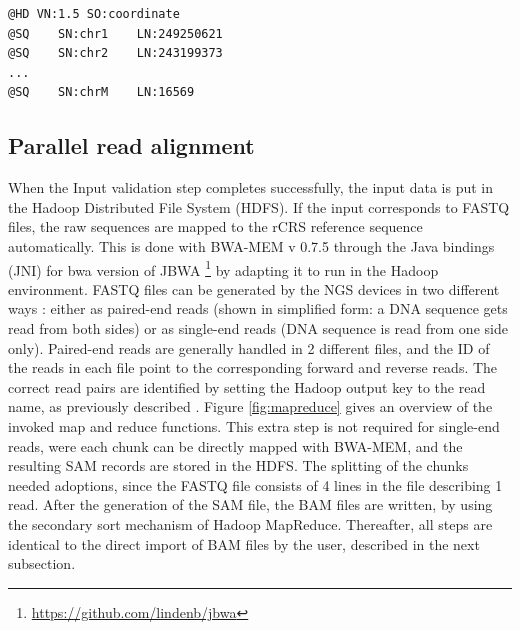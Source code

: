 \begin{lstlisting}[caption=Header of SAM/BAM file expecting length (LN) 16569 or 16571 for chrM, label=listBAMheader]
@HD VN:1.5 SO:coordinate
@SQ    SN:chr1    LN:249250621
@SQ    SN:chr2    LN:243199373
...
@SQ    SN:chrM    LN:16569
\end{lstlisting}

\subsection{Parallel read alignment}
When the Input validation step completes successfully, the input data is put in the Hadoop Distributed File System (HDFS). If the input corresponds to FASTQ files, the raw sequences are mapped to the rCRS reference sequence automatically. This is done with BWA-MEM v 0.7.5 \cite{Li2013a} through the Java bindings (JNI) for bwa version of JBWA \footnote{\url{https://github.com/lindenb/jbwa}} by adapting it to run in the Hadoop environment. FASTQ files can be generated by the NGS devices in two different ways : either as paired-end reads (shown in simplified form: a DNA sequence gets read from both sides) or as single-end reads (DNA sequence is read from one side only). Paired-end reads are generally handled in 2 different files, and the ID of the reads in each file point to the corresponding forward and reverse reads.
The correct read pairs are identified by setting the Hadoop output key to the read name, as previously described \cite{Weissensteiner2016b, Pireddu2011}. Figure \ref{fig:mapreduce} gives an overview of the invoked map and reduce functions. This extra step is not required for single-end reads, were each chunk can be directly mapped with BWA-MEM, and the resulting SAM records are stored in the HDFS. The splitting of the chunks needed adoptions, since the FASTQ file consists of 4 lines in the file describing 1 read. After the generation of the SAM file, the BAM files are written, by using the secondary sort mechanism of Hadoop MapReduce. Thereafter, all steps are identical to the direct import of BAM files by the user, described in the next subsection.
